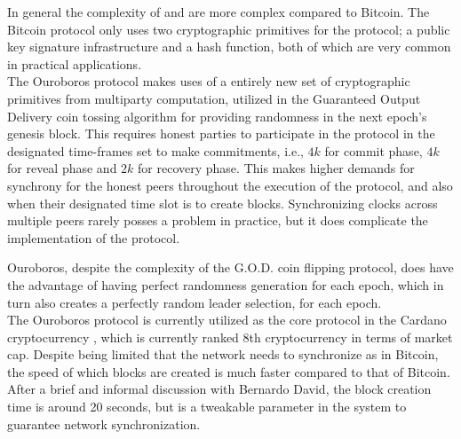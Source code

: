 In general the complexity of \cite{ouroboros} and \cite{ouroboros-praos} are more complex compared to Bitcoin. The Bitcoin protocol only uses two cryptographic primitives for the protocol; a public key signature infrastructure and a hash function, both of which are very common in practical applications.\\

The Ouroboros protocol makes uses of a entirely new set of cryptographic primitives from multiparty computation, utilized in the Guaranteed Output Delivery coin tossing algorithm for providing randomness in the next epoch's genesis block. This requires honest parties to participate in the protocol in the designated time-frames set to make commitments, i.e., $4k$ for commit phase, $4k$ for reveal phase and $2k$ for recovery phase. This makes higher demands for synchrony for the honest peers throughout the execution of the protocol, and also when their designated time slot is to create blocks. Synchronizing clocks across multiple peers rarely posses a problem in practice, but it does complicate the implementation of the protocol. 

Ouroboros, despite the complexity of the G.O.D. coin flipping protocol, does have the advantage of having perfect randomness generation for each epoch, which in turn also creates a perfectly random leader selection, for each epoch.\\

The Ouroboros protocol is currently utilized as the core protocol in the Cardano cryptocurrency \cite{cardano-ouro}, which is currently ranked 8th cryptocurrency in terms of market cap. Despite being limited that the network needs to synchronize as in Bitcoin, the speed of which blocks are created is much faster compared to that of Bitcoin. After a brief and informal discussion with Bernardo David, the block creation time is around 20 seconds, but is a tweakable parameter in the system to guarantee network synchronization.

